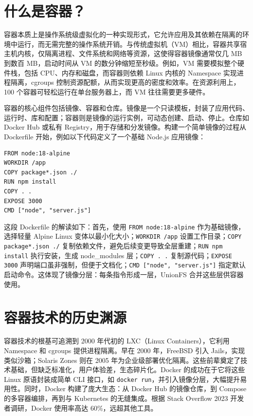 \section{什么是容器？}
容器本质上是操作系统级虚拟化的一种实现形式，它允许应用及其依赖在隔离的环境中运行，而无需完整的操作系统开销。与传统虚拟机（VM）相比，容器共享宿主机内核，仅隔离进程、文件系统和网络等资源，这使得容器镜像通常仅几 MB 到数百 MB，启动时间从 VM 的数分钟缩短至秒级。例如，VM 需要模拟整个硬件栈，包括 CPU、内存和磁盘，而容器则依赖 Linux 内核的 Namespace 实现进程隔离，cgroups 控制资源配额，从而实现更高的密度和效率。在资源利用上，100 个容器可轻松运行在单台服务器上，而 VM 往往需要更多硬件。\par
容器的核心组件包括镜像、容器和仓库。镜像是一个只读模板，封装了应用代码、运行时、库和配置；容器则是镜像的运行实例，可动态创建、启动、停止。仓库如 Docker Hub 或私有 Registry，用于存储和分发镜像。构建一个简单镜像的过程从 Dockerfile 开始，例如以下代码定义了一个基础 Node.js 应用镜像：\par
\begin{lstlisting}
FROM node:18-alpine
WORKDIR /app
COPY package*.json ./
RUN npm install
COPY . .
EXPOSE 3000
CMD ["node", "server.js"]
\end{lstlisting}
这段 Dockerfile 的解读如下：首先，使用 \texttt{FROM node:18-alpine} 作为基础镜像，选择轻量 Alpine Linux 变体以最小化大小；\texttt{WORKDIR /app} 设置工作目录；\texttt{COPY package*.json ./} 复制依赖文件，避免后续变更导致全层重建；\texttt{RUN npm install} 执行安装，生成 node\_{}modules 层；\texttt{COPY . .} 复制源代码；\texttt{EXPOSE 3000} 声明端口虽非强制，但便于文档化；\texttt{CMD ["node", "server.js"]} 指定默认启动命令。这体现了镜像分层：每条指令形成一层，UnionFS 合并这些层供容器使用。\par
\section{容器技术的历史渊源}
容器技术的根基可追溯到 2000 年代初的 LXC（Linux Containers），它利用 Namespace 和 cgroups 提供进程隔离。早在 2000 年，FreeBSD 引入 Jails，实现类似沙箱；Solaris Zones 则在 2005 年为企业级部署优化隔离。这些前辈奠定了技术基础，但缺乏标准化，用户体验差，生态碎片化。Docker 的成功在于它将这些 Linux 原语封装成简单 CLI 接口，如 \texttt{docker run}，并引入镜像分层，大幅提升易用性。同时，Docker 构建了庞大生态：从 Docker Hub 的镜像仓库，到 Compose 的多容器编排，再到与 Kubernetes 的无缝集成。根据 Stack Overflow 2023 开发者调研，Docker 使用率高达 60\%{}，远超其他工具。\par
